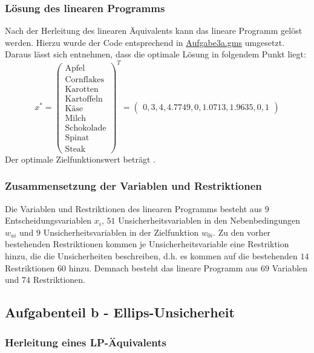 \documentclass[a4paper,12pt]{article}
\begin{document}
\newpage

\subsubsection*{L\"osung des linearen Programms}

Nach der Herleitung des linearen \"Aquivalents kann das lineare Programm gel\"ost werden. Hierzu wurde der Code entsprechend in \href{../src/r3/Aufgabe3a.gms}{Aufgabe3a.gms} umgesetzt.
Daraus l\"asst sich entnehmen, dass die optimale L\"osung in folgendem Punkt liegt:
\[
x^* = \begin{pmatrix}
    \text{Apfel} \\ \text{Cornflakes} \\ \text{Karotten} \\ \text{Kartoffeln} \\ \text{K\"ase} \\ \text{Milch} \\ \text{Schokolade} \\ \text{Spinat} \\ \text{Steak}
    \end{pmatrix}^T
     =
     \begin{pmatrix}
     0, 3, 4, 4.7749, 0, 1.0713, 1.9635, 0, 1
        \end{pmatrix}
\]
Der optimale Zielfunktionswert betr\"agt .

\subsubsection*{Zusammensetzung der Variablen und Restriktionen} 

Die Variablen und Restriktionen des linearen Programms besteht aus $9$ Entscheidungsvariablen $x_i$, $51$ Unsicherheitsvariablen in den Nebenbedingungen $w_{ai}$ und $9$ Unsicherheitsvariablen in der Zielfunktion $w_{0i}$.
Zu den vorher bestehenden Restriktionen kommen je Unsicherheitsvariable eine Restriktion hinzu, die die Unsicherheiten beschreiben, d.h. es kommen auf die bestehenden $14$ Restriktionen $60$ hinzu.
Demnach besteht das lineare Programm aus $69$ Variablen und $74$ Restriktionen.

\newpage

\subsection*{Aufgabenteil b - Ellips-Unsicherheit}

\subsubsection*{Herleitung eines LP-\"Aquivalents}
\end{document}
